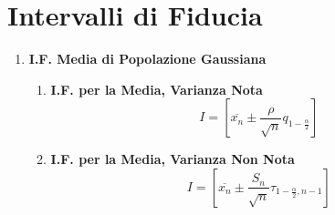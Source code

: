 \documentclass{article}
\begin{document}
\section{Intervalli di Fiducia}

\begin{enumerate}
    \item \textbf{I.F. Media di Popolazione Gaussiana}
    \begin{enumerate}
        \item \textbf{I.F. per la Media, Varianza Nota}
        \[ \boxed{I = \left[ \overline{x_n} \pm \frac{\rho}{\sqrt{n}}q_{1 - \frac{\alpha}{2}} \right]} \]
        \item \textbf{I.F. per la Media, Varianza Non Nota}
        \[ \boxed{I = \left[ \overline{x_n} \pm \frac{S_n}{\sqrt{n}}\tau_{1-\frac{\alpha}{2}, n - 1} \right] } \]
    \end{enumerate}
\end{enumerate}

\newpage

\end{document}
